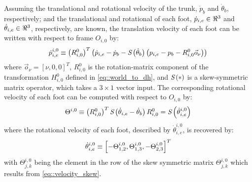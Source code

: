 			Assuming the translational and rotational velocity of the trunk, $\dot{p}_{b}$ and $\dot{\theta}_{b}$, respectively; and the translational and rotational of each \Ith foot, $\dot{p}_{i,e} \in\Re^{3}$ and $\dot{\theta}_{i,e} \in\Re^{3}$, respectively, are known, the translation velocity of each \Ith foot can be written with respect to frame $O_{i,0}$ by:
				\begin{equation}
					\dot{p}_{i,e}^{i,0} \equiv \left(R^{0}_{i,0}\right)^{T} \left( \dot{p}_{i,e} - \dot{p}_{b} - \emph{S}\left( \dot{\theta}_{b} \right) \left( {p}_{i,e} - {p}_{b} - R^{0}_{i,0} \vec{o}_{\nu} \right) \right)
				\end{equation}
			where $\vec{o}_{\nu} = [\nu,0,0]^{T}$, $R^{0}_{i,0}$ is the rotation-matrix component of the transformation $H^{0}_{i,0}$ defined in \ref{eq::world_to_dh}, and $\emph{S}\left(*\right)$ is a skew-symmetric matrix operator, which takes a $3\times1$ vector input. The corresponding rotational velocity of each \Ith foot  can be computed with respect to $O_{i,0}$ by:
				\begin{equation}
					\Theta^{i,0} \equiv \left( R^{0}_{i,0} \right)^{T} \emph{S}\left( \dot{\theta}_{i,e} - \dot{\theta}_{b} \right) R^{0}_{i,0}  = \emph{S}\left( \dot{\theta}^{i,0}_{i,e} \right)
				\label{eq::velocity_skew}
				\end{equation}
			where the rotational velocity of each foot, described by $\dot{\theta}^{i,0}_{i,e}$, is recovered by:
				\begin{equation}
					\dot{\theta}^{i,0}_{i,e} \equiv \left[ 
						-\Theta^{i,0}_{1,2},
						 \Theta^{i,0}_{1,3},
						-\Theta^{i,0}_{2,3}
					\right]^{T}
				\end{equation}
			with $\Theta^{i,0}_{j,k}$ being the \Kth element in the \Jth row of the skew symmetric matrix $\Theta^{i,0}_{j,k}$ which results from \ref{eq::velocity_skew}.


